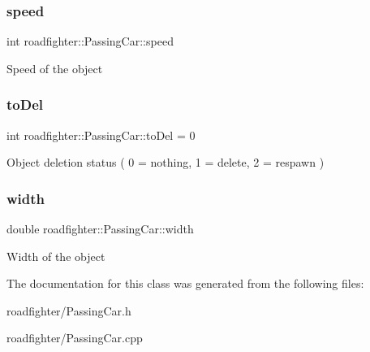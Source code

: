 \subsubsection{\texorpdfstring{speed}{speed}}
{\footnotesize\ttfamily int roadfighter\+::\+Passing\+Car\+::speed\hspace{0.3cm}{\ttfamily [protected]}}

Speed of the object \mbox{\label{classroadfighter_1_1PassingCar_aa1607598fb0724778dc38404313a5b6c}} 
\subsubsection{\texorpdfstring{to\+Del}{toDel}}
{\footnotesize\ttfamily int roadfighter\+::\+Passing\+Car\+::to\+Del = 0\hspace{0.3cm}{\ttfamily [protected]}}

Object deletion status ( 0 = nothing, 1 = delete, 2 = respawn ) \mbox{\label{classroadfighter_1_1PassingCar_a5168bee8ec5bd08cd42599738d20ccab}} 
\subsubsection{\texorpdfstring{width}{width}}
{\footnotesize\ttfamily double roadfighter\+::\+Passing\+Car\+::width\hspace{0.3cm}{\ttfamily [protected]}}

Width of the object 

The documentation for this class was generated from the following files\+:\begin{DoxyCompactItemize}
\item 
roadfighter/Passing\+Car.\+h\item 
roadfighter/Passing\+Car.\+cpp\end{DoxyCompactItemize}
